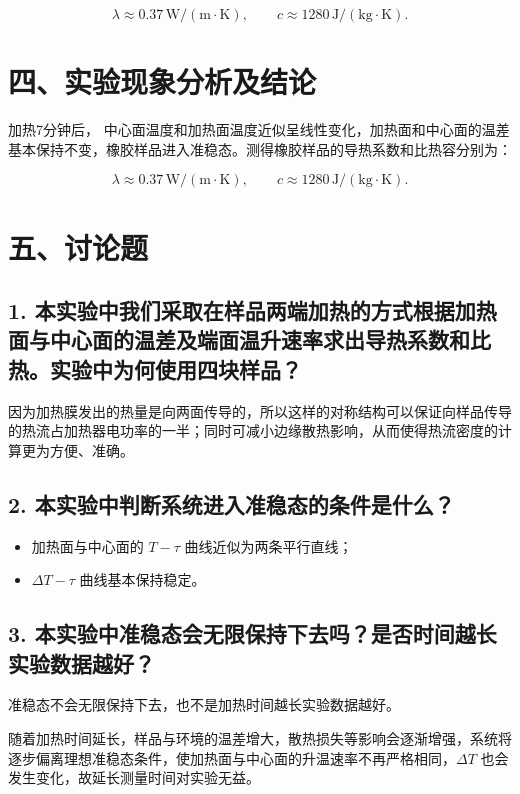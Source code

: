 \documentclass{ctexart}
\begin{document}
\[
\lambda \approx 0.37\,\mathrm{W/(m\cdot K)},
\qquad
c \approx 1280\,\mathrm{J/(kg\cdot K)}.
\]

\section*{四、实验现象分析及结论}

加热7分钟后， 中心面温度和加热面温度近似呈线性变化，加热面和中心面的温差基本保持不变，橡胶样品进入准稳态。测得橡胶样品的导热系数和比热容分别为：

\[
\lambda \approx 0.37\,\mathrm{W/(m\cdot K)},
\qquad
c \approx 1280\,\mathrm{J/(kg\cdot K)}.
\]

\section*{五、讨论题}

\subsection*{1. 本实验中我们采取在样品两端加热的方式根据加热面与中心面的温差及端面温升速率求出导热系数和比热。实验中为何使用四块样品？}

因为加热膜发出的热量是向两面传导的，所以这样的对称结构可以保证向样品传导的热流占加热器电功率的一半；同时可减小边缘散热影响，从而使得热流密度的计算更为方便、准确。

\subsection*{2. 本实验中判断系统进入准稳态的条件是什么？}

\begin{itemize}
    \item 加热面与中心面的 $T-\tau$ 曲线近似为两条平行直线；
    \item $\Delta T-\tau$ 曲线基本保持稳定。
\end{itemize}

\subsection*{3. 本实验中准稳态会无限保持下去吗？是否时间越长实验数据越好？}

准稳态不会无限保持下去，也不是加热时间越长实验数据越好。

随着加热时间延长，样品与环境的温差增大，散热损失等影响会逐渐增强，系统将逐步偏离理想准稳态条件，使加热面与中心面的升温速率不再严格相同，$\Delta T$ 也会发生变化，故延长测量时间对实验无益。
\end{document}
